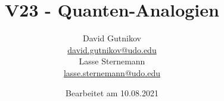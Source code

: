 

\title{V23 - Quanten-Analogien}
\author{
  David Gutnikov\\
  \href{mailto:david.gutnikov@udo.edu}{david.gutnikov@udo.edu}\\
  Lasse Sternemann\\
  \href{mailto:lasse.sternemann@udo.edu}{lasse.sternemann@udo.edu}
}
\date{Bearbeitet am 10.08.2021}


    \maketitle
    \newpage
    \tableofcontents
    \newpage

    
    
    
    \newpage
    

    \newpage
    \printbibliography


